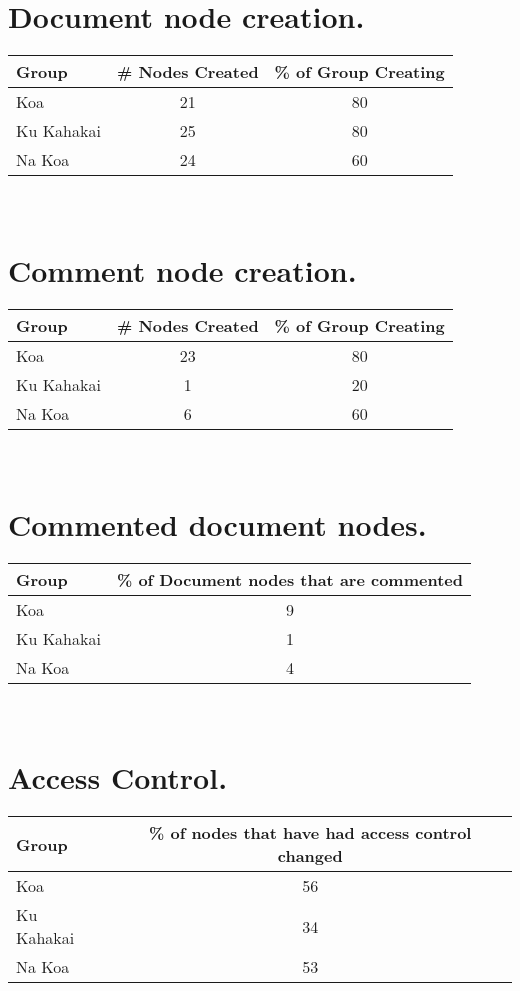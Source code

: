 \section{Document node creation.}
\begin{tabular}{|l|c|c|}
\hline
Group&\# Nodes Created&\% of Group Creating\\
\hline
Koa&21&80\\
\hline
Ku Kahakai&25&80\\
\hline
Na Koa&24&60\\
\hline
\end{tabular} \\

\section{Comment node creation.}
\begin{tabular}{|l|c|c|}
\hline
Group&\# Nodes Created&\% of Group Creating\\
\hline
Koa&23&80\\
\hline
Ku Kahakai&1&20\\
\hline
Na Koa&6&60\\
\hline
\end{tabular} \\

\section{Commented document nodes.}
\begin{tabular}{|l|c|}
\hline
Group&\% of Document nodes that are commented\\
\hline
Koa&9\\
\hline
Ku Kahakai&1\\
\hline
Na Koa&4\\
\hline
\end{tabular} \\


\section{Access Control.}
\begin{tabular}{|l|c|}
\hline
Group&\% of nodes that have had access control changed\\
\hline
Koa&56\\
\hline
Ku Kahakai&34\\
\hline
Na Koa&53\\
\hline
\end{tabular} \\


